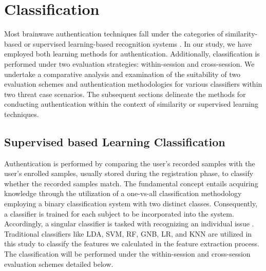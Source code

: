 \begin{itemize}

\end{itemize}
\section{Classification}
\label{sec:Framework:Classification}

Most brainwave authentication techniques fall under the categories of similarity-based or supervised learning-based recognition systems \cite{survey_brain_biometrics}. In our study, we have employed both learning methods for authentication. Additionally, classification is performed under two evaluation strategies: within-session and cross-session. We undertake a comparative analysis and examination of the suitability of two evaluation schemes and authentication methodologies for various classifiers within two threat case scenarios. The subsequent sections delineate the methods for conducting authentication within the context of similarity or supervised learning techniques.
\subsection{\large Supervised based Learning Classification}
\label{sec:Framework:Classification:Supervised based Learning Classification}
Authentication is performed by comparing the user’s recorded samples with the user’s enrolled samples, usually stored during the registration phase, to classify whether the recorded samples match. The fundamental concept entails acquiring knowledge through the utilization of a one-vs-all classification methodology employing a binary classification system with two distinct classes. Consequently, a classifier is trained for each subject to be incorporated into the system. Accordingly, a singular classifier is tasked with recognizing an individual issue \cite{arias2023performance}. Traditional classifiers like LDA, SVM, RF, GNB, LR, and KNN are utilized in this study to classify the features we calculated in the feature extraction process. The classification will be performed under the within-session and cross-session evaluation schemes detailed below.

